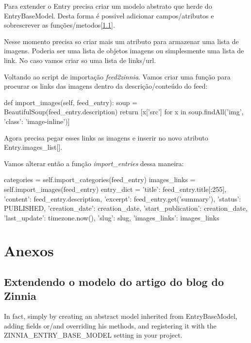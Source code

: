 
Para extender o Entry precisa criar um modelo abstrato que herde do
EntryBaseModel. Desta forma é possivel adicionar campos/atributos e sobrescrever as
funções/metodos[\ref{ExtZinniaEntry}]. 

Nesse momento precisa so criar mais um atributo para armazenar uma
lista de imagens. Poderia ser uma lista de objetos imagens ou
simplesmente uma lista de link. No caso vamos criar so uma lista de
links/url.

Voltando ao script de importação \emph{feed2zinnia}. Vamos criar uma
função para procurar os links das imagens dentro da descrição/conteúdo
do feed:

\begin{code}
def import_images(self, feed_entry):
    soup = BeautifulSoup(feed_entry.description)
    return [x['src'] for x in soup.findAll('img', {'class': 'image-inline'})]
\end{code}

Agora precisa pegar esses links as imagens e inserir no novo atributo
Entry.images_list[].

Vamos alterar então a função \emph{import_entries} dessa maneira:

\begin{code}
categories = self.import_categories(feed_entry)
            images_links = self.import_images(feed_entry)
            entry_dict = {'title': feed_entry.title[:255],
                          'content': feed_entry.description,
                          'excerpt': feed_entry.get('summary'),
                          'status': PUBLISHED,
                          'creation_date': creation_date,
                          'start_publication': creation_date,
                          'last_update': timezone.now(),
                          'slug': slug,
                          'images_links': images_links}
\end{code}


\chapter{Anexos}
\section{Extendendo o modelo do artigo do blog do Zinnia}\label{ExtZinniaEntry}
In fact, simply by creating an abstract model inherited from
EntryBaseModel, adding fields or/and overriding his methods, and
registering it with the ZINNIA_ENTRY_BASE_MODEL setting in your
project.

